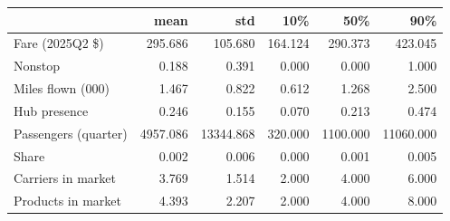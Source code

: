 \begin{tabular}{lrrrrr}
\toprule
 & mean & std & 10\% & 50\% & 90\% \\
\midrule
Fare (2025Q2 \$) & 295.686 & 105.680 & 164.124 & 290.373 & 423.045 \\
Nonstop & 0.188 & 0.391 & 0.000 & 0.000 & 1.000 \\
Miles flown (000) & 1.467 & 0.822 & 0.612 & 1.268 & 2.500 \\
Hub presence & 0.246 & 0.155 & 0.070 & 0.213 & 0.474 \\
Passengers (quarter) & 4957.086 & 13344.868 & 320.000 & 1100.000 & 11060.000 \\
Share & 0.002 & 0.006 & 0.000 & 0.001 & 0.005 \\
Carriers in market & 3.769 & 1.514 & 2.000 & 4.000 & 6.000 \\
Products in market & 4.393 & 2.207 & 2.000 & 4.000 & 8.000 \\
\bottomrule
\end{tabular}
\par\vspace{2pt}{\footnotesize 334,945 products in 100,269 markets (9,211 airport pairs), 2022Q1--2025Q2.}
